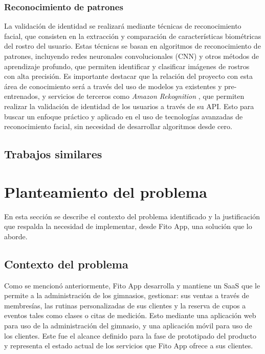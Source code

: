 \subsubsection{Reconocimiento de patrones}
La validación de identidad se realizará mediante técnicas de reconocimiento facial, que consisten en la extracción y comparación de características biométricas del rostro del usuario. Estas técnicas se basan en algoritmos de reconocimiento de patrones, incluyendo redes neuronales convolucionales (CNN) y otros métodos de aprendizaje profundo, que permiten identificar y clasificar imágenes de rostros con alta precisión. Es importante destacar que la relación del proyecto con esta área de conocimiento será a través del uso de modelos ya existentes y pre-entrenados, y servicios de terceros como \textit{Amazon Rekognition} \cite{amazon_rekognition}, que permiten realizar la validación de identidad de los usuarios a través de su API. Esto para buscar un enfoque práctico y aplicado en el uso de tecnologías avanzadas de reconocimiento facial, sin necesidad de desarrollar algoritmos desde cero.

\subsection{Trabajos similares}





\section{Planteamiento del problema}

En esta sección se describe el contexto del problema identificado y la justificación que respalda la necesidad de implementar, desde Fito App, una solución que lo aborde.

\subsection{Contexto del problema}

Como se mencionó anteriormente, Fito App desarrolla y mantiene un SaaS que le permite a la administración de los gimnasios, gestionar: sus ventas a través de membresías, las rutinas personalizadas de sus clientes y la reserva de cupos a eventos tales como clases o citas de medición. Esto mediante una aplicación web para uso de la administración del gimnasio,  y una aplicación móvil para uso de los clientes. Este fue el alcance definido para la fase de prototipado del producto y representa el estado actual de los servicios que Fito App ofrece a sus clientes.

